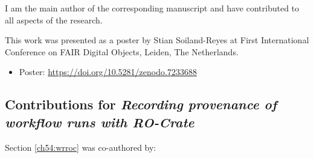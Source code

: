 I am the main author of the corresponding manuscript and have contributed to all aspects of the research. 


This work was presented as a poster by Stian Soiland-Reyes at First International Conference on FAIR Digital Objects, Leiden, The Netherlands.

\begin{itemize}
\tightlist
\item
  Poster: \url{https://doi.org/10.5281/zenodo.7233688}
\end{itemize}


\subsection{Contributions for \emph{Recording provenance of workflow runs with RO-Crate}}
\label{ch10:wrroc}


Section \vref{ch54:wrroc} was co-authored by:

